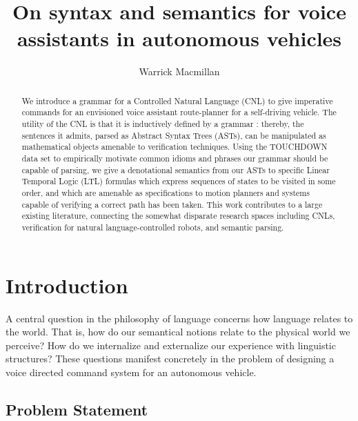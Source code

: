 \documentclass{article}
\author{Warrick Macmillan}
\title{On syntax and semantics for voice assistants in autonomous vehicles}
\begin{document}
\begin{titlepage}

\maketitle

\begin{abstract}

We introduce a grammar for a Controlled Natural Language (CNL) to give
imperative commands for an envisioned voice assistant route-planner for a
self-driving vehicle. The utility of the CNL is that it is inductively defined
by a grammar : thereby, the sentences it admits, parsed as Abstract Syntax Trees
(ASTs), can be manipulated as mathematical objects amenable to verification
techniques. Using the TOUCHDOWN data set to empirically motivate common idioms
and phrases our grammar should be capable of parsing, we give a denotational
semantics from our ASTs to specific Linear Temporal Logic (LTL) formulas which
express sequences of states to be visited in some order, and which are amenable
as specifications to motion planners and systems capable of verifying a correct
path has been taken. This work contributes to a large existing literature,
connecting the somewhat disparate research spaces including CNLs, verification
for natural language-controlled robots, and semantic parsing.

\end{abstract}

\vfill

\thispagestyle{empty}
\end{titlepage}

\newpage
\tableofcontents

\newpage
\setcounter{page}{1}


\section{Introduction}

A central question in the philosophy of language concerns how language relates
to the world. That is, how do our semantical notions relate to the physical
world we perceive? How do we internalize and externalize our experience with
linguistic structures? These questions manifest concretely in the problem of
designing a voice directed command system for an autonomous vehicle.

\subsection{Problem Statement}
\end{document}
